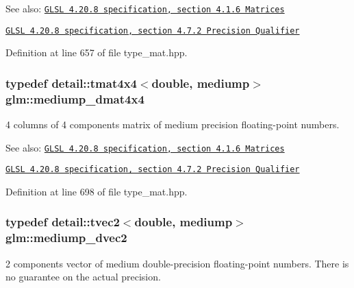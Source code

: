 \begin{Desc}
\item[See also:]\href{http://www.opengl.org/registry/doc/GLSLangSpec.4.20.8.pdf}{\tt GLSL 4.20.8 specification, section 4.1.6 Matrices} 

\href{http://www.opengl.org/registry/doc/GLSLangSpec.4.20.8.pdf}{\tt GLSL 4.20.8 specification, section 4.7.2 Precision Qualifier} \end{Desc}


Definition at line 657 of file type\_\-mat.hpp.\hypertarget{group__core__precision_gd64329d45b05417ccf0cc3c23f584d26}{
\subsubsection[mediump\_\-dmat4x4]{\setlength{\rightskip}{0pt plus 5cm}typedef detail::tmat4x4$<$double, mediump$>$ {\bf glm::mediump\_\-dmat4x4}}}
\label{group__core__precision_gd64329d45b05417ccf0cc3c23f584d26}


4 columns of 4 components matrix of medium precision floating-point numbers.

\begin{Desc}
\item[See also:]\href{http://www.opengl.org/registry/doc/GLSLangSpec.4.20.8.pdf}{\tt GLSL 4.20.8 specification, section 4.1.6 Matrices} 

\href{http://www.opengl.org/registry/doc/GLSLangSpec.4.20.8.pdf}{\tt GLSL 4.20.8 specification, section 4.7.2 Precision Qualifier} \end{Desc}


Definition at line 698 of file type\_\-mat.hpp.\hypertarget{group__core__precision_gce1f1cc2eb8e978dcb60e682af87b541}{
\subsubsection[mediump\_\-dvec2]{\setlength{\rightskip}{0pt plus 5cm}typedef detail::tvec2$<$double, mediump$>$ {\bf glm::mediump\_\-dvec2}}}
\label{group__core__precision_gce1f1cc2eb8e978dcb60e682af87b541}


2 components vector of medium double-precision floating-point numbers. There is no guarantee on the actual precision.

